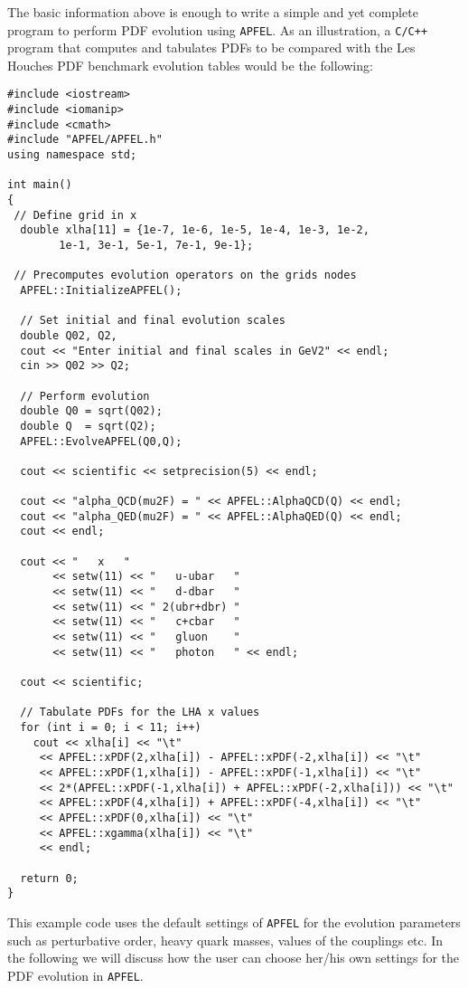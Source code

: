 \documentclass[11pt,a4paper]{article}
\begin{document}
The basic information above is enough to write a simple and yet complete
program to perform PDF evolution using {\tt APFEL}.
%
As an illustration, a {\tt C/C++} program that computes and tabulates
PDFs to be compared with the Les Houches PDF benchmark evolution 
tables would be the following:
\begin{lstlisting}
#include <iostream>
#include <iomanip>
#include <cmath>
#include "APFEL/APFEL.h"
using namespace std;

int main()
{
 // Define grid in x
  double xlha[11] = {1e-7, 1e-6, 1e-5, 1e-4, 1e-3, 1e-2, 
		1e-1, 3e-1, 5e-1, 7e-1, 9e-1};
  
 // Precomputes evolution operators on the grids nodes
  APFEL::InitializeAPFEL();

  // Set initial and final evolution scales
  double Q02, Q2,
  cout << "Enter initial and final scales in GeV2" << endl;
  cin >> Q02 >> Q2;

  // Perform evolution
  double Q0 = sqrt(Q02);
  double Q  = sqrt(Q2);
  APFEL::EvolveAPFEL(Q0,Q);

  cout << scientific << setprecision(5) << endl;
  
  cout << "alpha_QCD(mu2F) = " << APFEL::AlphaQCD(Q) << endl;
  cout << "alpha_QED(mu2F) = " << APFEL::AlphaQED(Q) << endl;
  cout << endl;

  cout << "   x   " 
       << setw(11) << "   u-ubar   " 
       << setw(11) << "   d-dbar   " 
       << setw(11) << " 2(ubr+dbr) " 
       << setw(11) << "   c+cbar   " 
       << setw(11) << "   gluon    " 
       << setw(11) << "   photon   " << endl;

  cout << scientific;

  // Tabulate PDFs for the LHA x values
  for (int i = 0; i < 11; i++)
    cout << xlha[i] << "\t"  
	 << APFEL::xPDF(2,xlha[i]) - APFEL::xPDF(-2,xlha[i]) << "\t"
	 << APFEL::xPDF(1,xlha[i]) - APFEL::xPDF(-1,xlha[i]) << "\t"
	 << 2*(APFEL::xPDF(-1,xlha[i]) + APFEL::xPDF(-2,xlha[i])) << "\t"
	 << APFEL::xPDF(4,xlha[i]) + APFEL::xPDF(-4,xlha[i]) << "\t"
	 << APFEL::xPDF(0,xlha[i]) << "\t"
	 << APFEL::xgamma(xlha[i]) << "\t"
	 << endl;

  return 0;
}
\end{lstlisting}
This example code uses the default settings of {\tt APFEL} for the
evolution parameters such as perturbative order, heavy quark masses, values of the couplings etc.
%
In the following we will discuss how the user can choose her/his own settings
for the PDF evolution in {\tt APFEL}.
\end{document}
